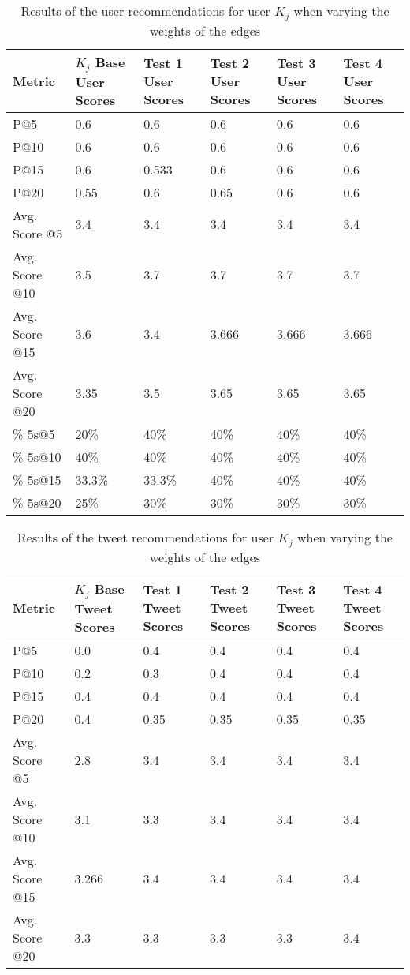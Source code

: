 \begin{table}
\centering
\begin{tabular}{l|p{1.5cm}|p{1.5cm}|p{1.5cm}|p{1.5cm}|p{1.5cm}}
{\bf Metric} & {\bf $K_{j}$ Base User Scores} & {\bf Test 1 User Scores} & {\bf Test 2 User Scores} & {\bf Test 3 User Scores} & {\bf Test 4 User Scores} \\ \hline
P@5   & 0.6 & 0.6 & 0.6 & 0.6 & 0.6 \\ \hline
P@10 & 0.6 & 0.6 & 0.6 & 0.6 & 0.6 \\ \hline
P@15 & 0.6 & 0.533 & 0.6 & 0.6 & 0.6 \\ \hline
P@20 & 0.55 & 0.6 & 0.65 & 0.6 & 0.6 \\ \hline

Avg. Score @5   & 3.4 & 3.4 & 3.4 & 3.4 & 3.4 \\ \hline
Avg. Score @10 & 3.5 & 3.7 & 3.7 & 3.7 & 3.7 \\ \hline
Avg. Score @15 & 3.6 & 3.4 & 3.666 & 3.666 & 3.666 \\ \hline
Avg. Score @20 & 3.35 & 3.5 & 3.65 & 3.65 & 3.65 \\ \hline

\% 5s@5    & 20\% & 40\% & 40\% & 40\% & 40\% \\ \hline
\% 5s@10  & 40\% & 40\% & 40\% & 40\% & 40\% \\ \hline
\% 5s@15  & 33.3\% & 33.3\% & 40\% & 40\% & 40\% \\ \hline
\% 5s@20  & 25\% & 30\% & 30\% & 30\% & 30\% \\
\end{tabular}
\caption{Results of the user recommendations for user $K_{j}$ when varying the weights of the edges}
\label{tab:WeightsTestsUsers}
\end{table}


\begin{table}
\centering
\begin{tabular}{l|p{1.5cm}|p{1.5cm}|p{1.5cm}|p{1.5cm}|p{1.5cm}}
{\bf Metric} & {\bf $K_{j}$ Base Tweet Scores} & {\bf Test 1 Tweet Scores} & {\bf Test 2 Tweet Scores} & {\bf Test 3 Tweet Scores} & {\bf Test 4 Tweet Scores} \\ \hline
P@5   & 0.0 & 0.4 & 0.4 & 0.4 & 0.4 \\ \hline
P@10 & 0.2 & 0.3 & 0.4 & 0.4 & 0.4 \\ \hline
P@15 & 0.4 & 0.4 & 0.4 & 0.4 & 0.4 \\ \hline
P@20 & 0.4 & 0.35 & 0.35 & 0.35 & 0.35 \\ \hline

Avg. Score @5   & 2.8 & 3.4 & 3.4 & 3.4 & 3.4 \\ \hline
Avg. Score @10 & 3.1 & 3.3 & 3.4 & 3.4 & 3.4 \\ \hline
Avg. Score @15 & 3.266 & 3.4 & 3.4 & 3.4 & 3.4 \\ \hline
Avg. Score @20 & 3.3 & 3.3 & 3.3 & 3.3 & 3.4 \\
\end{tabular}
\caption{Results of the tweet recommendations for user $K_{j}$ when varying the weights of the edges}
\label{tab:WeightsTestsTweets}
\end{table}

